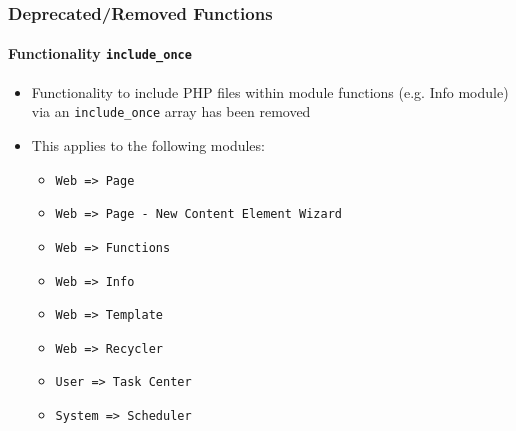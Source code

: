 
\begin{frame}[fragile]
	\frametitle{Deprecated/Removed Functions}
	\framesubtitle{Functionality \texttt{include\_once}}

	\begin{itemize}

		\item Functionality to include PHP files within module functions (e.g. Info module)
			via an \texttt{include\_once} array has been removed

		\item This applies to the following modules:

			\begin{itemize}
				\item \texttt{Web => Page}
				\item \texttt{Web => Page - New Content Element Wizard}
				\item \texttt{Web => Functions}
				\item \texttt{Web => Info}
				\item \texttt{Web => Template}
				\item \texttt{Web => Recycler}
				\item \texttt{User => Task Center}
				\item \texttt{System => Scheduler}
			\end{itemize}

	\end{itemize}

\end{frame}


